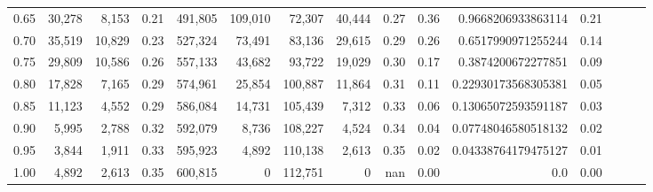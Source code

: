 \begin{tabular}{rrrrrrrrrrrrrrr}
0.65 &  30,278 &   8,153 &  0.21 &  491,805 &  109,010 &   72,307 &   40,444 &  0.27 &  0.36 &   0.9668206933863114 &      0.21 \\
0.70 &  35,519 &  10,829 &  0.23 &  527,324 &   73,491 &   83,136 &   29,615 &  0.29 &  0.26 &   0.6517990971255244 &      0.14 \\
0.75 &  29,809 &  10,586 &  0.26 &  557,133 &   43,682 &   93,722 &   19,029 &  0.30 &  0.17 &   0.3874200672277851 &      0.09 \\
0.80 &  17,828 &   7,165 &  0.29 &  574,961 &   25,854 &  100,887 &   11,864 &  0.31 &  0.11 &  0.22930173568305381 &      0.05 \\
0.85 &  11,123 &   4,552 &  0.29 &  586,084 &   14,731 &  105,439 &    7,312 &  0.33 &  0.06 &  0.13065072593591187 &      0.03 \\
0.90 &   5,995 &   2,788 &  0.32 &  592,079 &    8,736 &  108,227 &    4,524 &  0.34 &  0.04 &  0.07748046580518132 &      0.02 \\
0.95 &   3,844 &   1,911 &  0.33 &  595,923 &    4,892 &  110,138 &    2,613 &  0.35 &  0.02 &  0.04338764179475127 &      0.01 \\
1.00 &   4,892 &   2,613 &  0.35 &  600,815 &        0 &  112,751 &        0 &   nan &  0.00 &                  0.0 &      0.00 \\
\bottomrule
\end{tabular}
